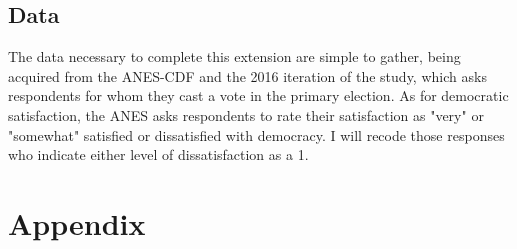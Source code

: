 \documentclass[12pt]{article}
\begin{document}
\subsection{Data}

The data necessary to complete this extension are simple to gather, being acquired from the ANES-CDF and the 2016 iteration of the study, which asks respondents for whom they cast a vote in the primary election. As for democratic satisfaction, the ANES asks respondents to rate their satisfaction as "very" or "somewhat" satisfied or dissatisfied with democracy. I will recode those responses who indicate either level of dissatisfaction as a 1.







\thispagestyle{empty}
\clearpage
{}

\section{Appendix}
\end{document}
